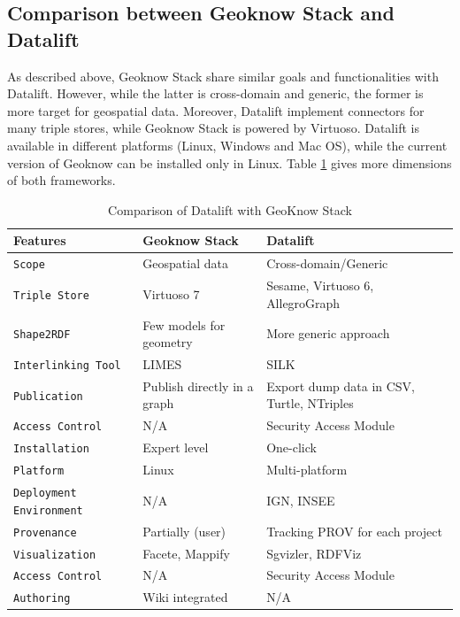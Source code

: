 
\subsection{Comparison between Geoknow Stack and Datalift}
\label{sec:geoknow-datalift}
As described above, Geoknow Stack share similar goals and functionalities with Datalift. However, while the latter is cross-domain and generic, the former is more target for geospatial data. Moreover, Datalift implement connectors for many triple stores, while Geoknow Stack is powered by Virtuoso. Datalift is available in different platforms (Linux, Windows and Mac OS), while the current version of Geoknow can be installed only in Linux. Table \ref{tab:geoknow-datalift} gives more dimensions of both frameworks.

\begin{table}[ht!bp]
    \caption{Comparison of Datalift with GeoKnow Stack} \label{tab:geoknow-datalift}
    \small
    \center
    \begin{tabularx}{\textwidth}{@{}llX@{}}
    \toprule
    \textbf{Features} 		& \textbf{Geoknow Stack } &  \textbf{Datalift} \\
    \toprule
    \texttt{Scope} 	& Geospatial data & Cross-domain/Generic\\
    \midrule
    \texttt{Triple Store} & Virtuoso 7 & Sesame, Virtuoso 6, AllegroGraph\\
    \midrule
    \texttt{Shape2RDF} &  Few models for geometry & More generic approach\\
    \midrule
    \texttt{Interlinking Tool} & LIMES & SILK \\
    \midrule
    \texttt{Publication} & Publish directly in a graph & Export dump data in CSV, Turtle, NTriples\\
    \midrule
    \texttt{Access Control} & N/A & Security Access Module\\
    \midrule
    \texttt{Installation} & Expert level & One-click\\
    \midrule
    \texttt{Platform} & Linux & Multi-platform\\
    \midrule
    \texttt{Deployment Environment} & N/A & IGN, INSEE\\
    \midrule
    \texttt{Provenance} & Partially (user) & Tracking PROV for each project\\
    \midrule
    \texttt{Visualization} & Facete, Mappify  & Sgvizler, RDFViz\\
    \midrule
    \texttt{Access Control} & N/A & Security Access Module\\
    \midrule
    \texttt{Authoring} & Wiki integrated & N/A\\
    \bottomrule

    \end{tabularx}
    \end{table}


